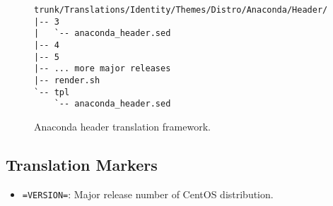 \begin{figure}
\hrulefill
\begin{verbatim}
trunk/Translations/Identity/Themes/Distro/Anaconda/Header/
|-- 3
|   `-- anaconda_header.sed
|-- 4
|-- 5
|-- ... more major releases
|-- render.sh
`-- tpl
    `-- anaconda_header.sed
\end{verbatim}
\hrulefill
\caption{Anaconda header translation framework.%
   \label{fig:Distribution:Anaconda:Header:Translations}}
\end{figure}

\subsection{Translation Markers}
\hypertarget{sec:Distribution:Anaconda:Header:Translations:Markers}{}
\label{sec:Distribution:Anaconda:Header:Translations:Markers}

\begin{itemize}
\item \texttt{=VERSION=}: Major release number of CentOS distribution.
\end{itemize}

